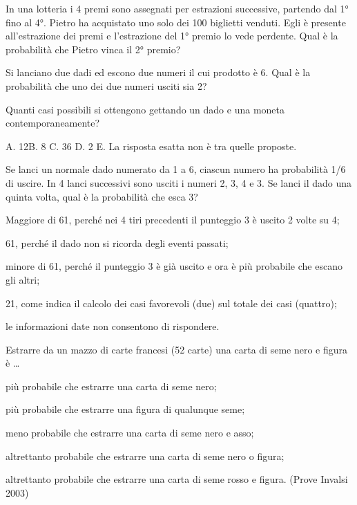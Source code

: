 \begin{esercizio} %
In una lotteria i 4 premi sono assegnati per estrazioni successive, partendo dal 1° fino al 4°. Pietro ha acquistato uno solo dei 100 biglietti venduti. Egli è presente all'estrazione dei premi e l'estrazione del 1° premio lo vede perdente. Qual è la probabilità che Pietro vinca il 2° premio?
\end{esercizio}

\begin{esercizio} %
Si lanciano due dadi ed escono due numeri il cui prodotto è 6. Qual è la probabilità che uno dei due numeri usciti sia 2?
\end{esercizio}

\begin{esercizio} %
Quanti casi possibili si ottengono gettando un dado e una moneta contemporaneamente?

A. 12\quad B. 8 \quad C. 36 \quad D. 2 \quad E. La risposta esatta non è tra quelle proposte.
\end{esercizio}

\begin{esercizio} %
 Se lanci un normale dado numerato da 1 a 6, ciascun numero ha probabilità 1/6 di uscire. In 4 lanci successivi sono usciti i numeri 2, 3, 4 e 3. Se lanci il dado una quinta volta, qual è la probabilità che esca 3?
\begin{itemize*}
\item Maggiore di 61, perché nei 4 tiri precedenti il punteggio 3 è uscito 2 volte su 4;
\item 61, perché il dado non si ricorda degli eventi passati;
\item minore di 61, perché il punteggio 3 è già uscito e ora è più probabile che escano gli altri;
\item 21, come indica il calcolo dei casi favorevoli (due) sul totale dei casi (quattro);
\item le informazioni date non consentono di rispondere.
\end{itemize*}
\end{esercizio}

\begin{esercizio} %
 Estrarre da un mazzo di carte francesi (52 carte) una carta di seme nero e figura è \ldots
\begin{itemize*}
\item più probabile che estrarre una carta di seme nero;
\item più probabile che estrarre una figura di qualunque seme;
\item meno probabile che estrarre una carta di seme nero e asso;
\item altrettanto probabile che estrarre una carta di seme nero o figura;
\item altrettanto probabile che estrarre una carta di seme rosso e figura. (Prove Invalsi 2003)
\end{itemize*}
\end{esercizio}

